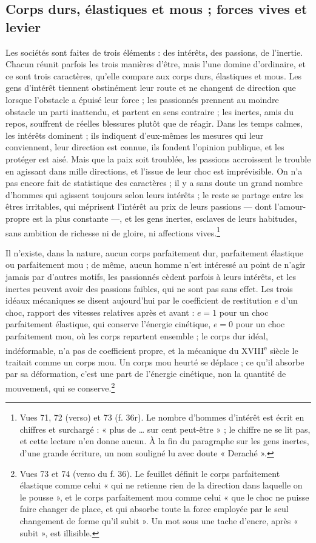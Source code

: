 \documentclass[11pt,a4paper]{article}
\begin{document}
\subsection*{Corps durs, élastiques et mous ; forces vives et levier}

Les sociétés sont faites de trois éléments : des intérêts, des passions, de
l'inertie. Chacun réunit parfois les trois manières d'être, mais l'une domine
d'ordinaire, et ce sont trois caractères, qu'elle compare aux corps durs,
élastiques et mous. Les gens d'intérêt tiennent obstinément leur route et ne
changent de direction que lorsque l'obstacle a épuisé leur force ; les
passionnés prennent au moindre obstacle un parti inattendu, et partent en sens
contraire ; les inertes, amis du repos, souffrent de réelles blessures plutôt que
de réagir. Dans les temps calmes, les intérêts dominent ; ils indiquent
d'eux-mêmes les mesures qui leur conviennent, leur direction est connue, ils
fondent l'opinion publique, et les protéger est aisé. Mais que la paix soit
troublée, les passions accroissent le trouble en agissant dans mille directions,
et l'issue de leur choc est imprévisible. On n'a pas encore fait de statistique
des caractères ; il y a sans doute un grand nombre d'hommes qui agissent toujours
selon leurs intérêts ; le reste se partage entre les êtres irritables, qui
méprisent l'intérêt au prix de leurs passions — dont l'amour-propre est la plus
constante —, et les gens inertes, esclaves de leurs habitudes, sans ambition de
richesse ni de gloire, ni affections vives.\footnote{Vues 71, 72 (verso) et 73
(f. 36r). Le nombre d'hommes d'intérêt est écrit en chiffres et surchargé : « plus
de … sur cent peut-être » ; le chiffre ne se lit pas, et cette lecture n'en donne
aucun. À la fin du paragraphe sur les gens inertes, d'une grande écriture, un
nom souligné lu avec doute « Deraché ».}

Il n'existe, dans la nature, aucun corps parfaitement dur, parfaitement
élastique ou parfaitement mou ; de même, aucun homme n'est intéressé au point de
n'agir jamais par d'autres motifs, les passionnés cèdent parfois à leurs
intérêts, et les inertes peuvent avoir des passions faibles, qui ne sont pas sans
effet. Les trois idéaux mécaniques se disent aujourd'hui par le coefficient de
restitution $e$ d'un choc, rapport des vitesses relatives après et avant : $e =
1$ pour un choc parfaitement élastique, qui conserve l'énergie cinétique, $e = 0$
pour un choc parfaitement mou, où les corps repartent ensemble ; le corps dur
idéal, indéformable, n'a pas de coefficient propre, et la mécanique du
XVIII\textsuperscript{e} siècle le traitait comme un corps mou. Un corps mou
heurté se déplace ; ce qu'il absorbe par sa déformation, c'est une part de
l'énergie cinétique, non la quantité de mouvement, qui se
conserve.\footnote{Vues 73 et 74 (verso du f. 36). Le feuillet définit le corps
parfaitement élastique comme celui « qui ne retienne rien de la direction dans
laquelle on le pousse », et le corps parfaitement mou comme celui « que le choc
ne puisse faire changer de place, et qui absorbe toute la force employée par le
seul changement de forme qu'il subit ». Un mot sous une tache d'encre, après
« subit », est illisible.}
\end{document}
